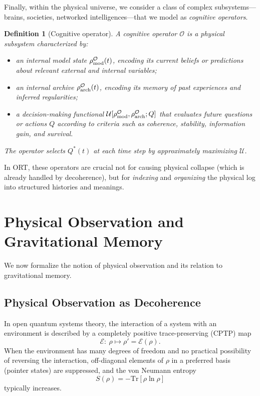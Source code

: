\documentclass[12pt,a4paper]{article}
\newtheorem{definition}{Definition}
\begin{document}
Finally, within the physical universe, we consider a class of complex subsystems---brains, societies, networked intelligences---that we model as \emph{cognitive operators}.

\begin{definition}[Cognitive operator]
A cognitive operator $\mathcal{O}$ is a physical subsystem characterized by:
\begin{itemize}
  \item an internal model state $\rho_{\rm mod}^{\mathcal{O}}(t)$, encoding its current beliefs or predictions about relevant external and internal variables;
  \item an internal archive $\rho_{\rm arch}^{\mathcal{O}}(t)$, encoding its memory of past experiences and inferred regularities;
  \item a decision-making functional $\mathcal{U}[\rho_{\rm mod}^{\mathcal{O}}, \rho_{\rm arch}^{\mathcal{O}}; Q]$ that evaluates future questions or actions $Q$ according to criteria such as coherence, stability, information gain, and survival.
\end{itemize}
The operator selects $Q^*(t)$ at each time step by approximately maximizing $\mathcal{U}$.
\end{definition}

In ORT, these operators are crucial not for causing physical collapse (which is already handled by decoherence), but for \emph{indexing} and \emph{organizing} the physical log into structured histories and meanings.

\section{Physical Observation and Gravitational Memory}
\label{sec:physical}

We now formalize the notion of physical observation and its relation to gravitational memory.

\subsection{Physical Observation as Decoherence}
\label{subsec:decoherence}

In open quantum systems theory, the interaction of a system with an environment is described by a completely positive trace-preserving (CPTP) map
\begin{equation}
  \mathcal{E}:\ \rho \mapsto \rho' = \mathcal{E}(\rho).
\end{equation}
When the environment has many degrees of freedom and no practical possibility of reversing the interaction, off-diagonal elements of $\rho$ in a preferred basis (pointer states) are suppressed, and the von Neumann entropy
\begin{equation}
  S(\rho) = -\mathrm{Tr}[\rho\ln\rho]
\end{equation}
typically increases.
\end{document}
